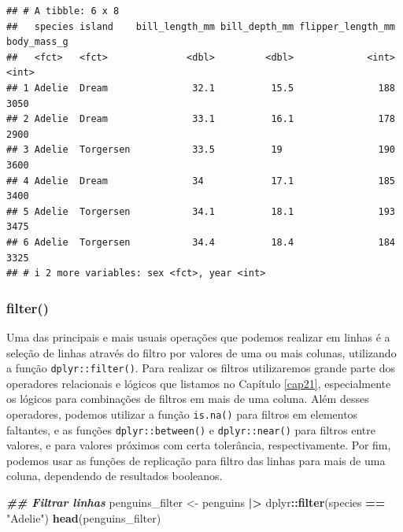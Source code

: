 \documentclass[
]{article}
\newenvironment{Shaded}{\begin{snugshade}}{\end{snugshade}}
\newcommand{\DocumentationTok}[1]{\textcolor[rgb]{0.56,0.35,0.01}{\textbf{\textit{#1}}}}
\newcommand{\FunctionTok}[1]{\textcolor[rgb]{0.13,0.29,0.53}{\textbf{#1}}}
\newcommand{\NormalTok}[1]{#1}
\newcommand{\OtherTok}[1]{\textcolor[rgb]{0.56,0.35,0.01}{#1}}
\newcommand{\SpecialCharTok}[1]{\textcolor[rgb]{0.81,0.36,0.00}{\textbf{#1}}}
\newcommand{\StringTok}[1]{\textcolor[rgb]{0.31,0.60,0.02}{#1}}
\begin{document}
\begin{verbatim}
## # A tibble: 6 x 8
##   species island    bill_length_mm bill_depth_mm flipper_length_mm body_mass_g
##   <fct>   <fct>              <dbl>         <dbl>             <int>       <int>
## 1 Adelie  Dream               32.1          15.5               188        3050
## 2 Adelie  Dream               33.1          16.1               178        2900
## 3 Adelie  Torgersen           33.5          19                 190        3600
## 4 Adelie  Dream               34            17.1               185        3400
## 5 Adelie  Torgersen           34.1          18.1               193        3475
## 6 Adelie  Torgersen           34.4          18.4               184        3325
## # i 2 more variables: sex <fct>, year <int>
\end{verbatim}

\hypertarget{filter}{%
\subsubsection{filter()}\label{filter}}

Uma das principais e mais usuais operações que podemos realizar em linhas é a seleção de linhas através do filtro por valores de uma ou mais colunas, utilizando a função \texttt{dplyr::filter()}. Para realizar os filtros utilizaremos grande parte dos operadores relacionais e lógicos que listamos no Capítulo \ref{cap21}, especialmente os lógicos para combinações de filtros em mais de uma coluna. Além desses operadores, podemos utilizar a função \texttt{is.na()} para filtros em elementos faltantes, e as funções \texttt{dplyr::between()} e \texttt{dplyr::near()} para filtros entre valores, e para valores próximos com certa tolerância, respectivamente. Por fim, podemos usar as funções de replicação para filtro das linhas para mais de uma coluna, dependendo de resultados booleanos.

\begin{Shaded}
\begin{Highlighting}[]
\DocumentationTok{\#\# Filtrar linhas}
\NormalTok{penguins\_filter }\OtherTok{\textless{}{-}}\NormalTok{ penguins }\SpecialCharTok{|\textgreater{}} 
\NormalTok{    dplyr}\SpecialCharTok{::}\FunctionTok{filter}\NormalTok{(species }\SpecialCharTok{==} \StringTok{"Adelie"}\NormalTok{)}
\FunctionTok{head}\NormalTok{(penguins\_filter)}
\end{Highlighting}
\end{Shaded}
\end{document}

